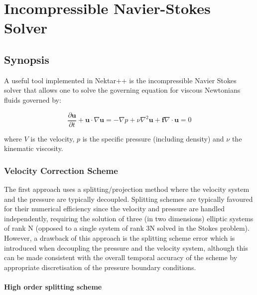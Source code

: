 \chapter{Incompressible Navier-Stokes Solver}
\label{IncNSsolver}

\section{Synopsis}
A useful tool implemented in Nektar++ is the incompressible Navier
Stokes solver that allows one to solve the governing equation for
viscous Newtonians fluids governed by:

\begin{subequations}
\begin{equation}
   \frac{\partial \mathbf{u}}{\partial t} + \mathbf{u} \cdot \nabla \mathbf{u} = -\nabla p + \nu \nabla^2 \mathbf{u} +  \mathbf{f} \label{eqn.NSmom}
 \end{equation}

 \begin{equation}
    \nabla \cdot \mathbf{u} = 0
    \end{equation}
 \end{subequations}

where $V$ is the velocity, $p$ is the specific pressure (including
density) and $\nu$ the kinematic viscosity.

\subsection{Velocity Correction Scheme}
\label{VCSscheme}
The first approach uses a splitting/projection method where the
velocity system and the pressure are typically
decoupled. Splitting schemes are typically favoured for their
numerical efficiency since the velocity and pressure are handled
independently, requiring the solution of three (in two dimensions)
elliptic systems of rank N (opposed to a single system of rank 3N
solved in the Stokes problem). However, a drawback of this approach is
the splitting scheme error which is introduced when decoupling the
pressure and the velocity system, although this can be made consistent
with the overall temporal accuracy of the scheme by appropriate
discretisation of the pressure boundary conditions.

\subsubsection{High order splitting scheme}

